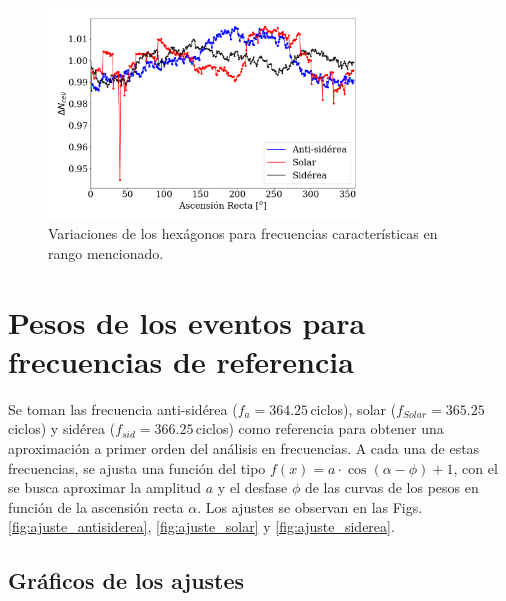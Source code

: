 			\begin{figure}[H]
				\centering
				\includegraphics[width=0.75\textwidth]{weights_2013_2020.png}
				\caption{Variaciones de los hexágonos para frecuencias características en rango mencionado. }
			\end{figure}

\section{Pesos de los eventos para frecuencias de referencia}

Se toman las frecuencia anti-sidérea ($f_a=364.25\,$ciclos), solar ($f_{Solar}= 365.25\,$ciclos) y sidérea ($f_{sid}= 366.25\,$ciclos) como referencia para obtener una aproximación a primer orden del análisis en frecuencias. A cada una de estas frecuencias, se ajusta una función del tipo  $f(x)=a\cdot \cos{(\alpha-\phi)} + 1$, con el se busca aproximar la amplitud $a$ y el desfase $\phi$ de las curvas de los pesos en función de la ascensión recta $\alpha$. Los ajustes se observan en las Figs. \ref{fig:ajuste_antisiderea}, \ref{fig:ajuste_solar} y \ref{fig:ajuste_siderea}.


\subsection{Gráficos de los ajustes}


